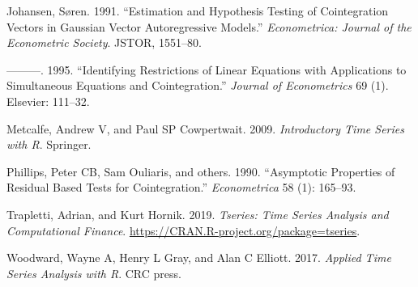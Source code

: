 \documentclass[12pt,]{article}
\begin{document}
\leavevmode\hypertarget{ref-johansen1991estimation}{}%
Johansen, Søren. 1991. ``Estimation and Hypothesis Testing of Cointegration Vectors in Gaussian Vector Autoregressive Models.'' \emph{Econometrica: Journal of the Econometric Society}. JSTOR, 1551--80.

\leavevmode\hypertarget{ref-johansen1995identifying}{}%
---------. 1995. ``Identifying Restrictions of Linear Equations with Applications to Simultaneous Equations and Cointegration.'' \emph{Journal of Econometrics} 69 (1). Elsevier: 111--32.

\leavevmode\hypertarget{ref-metcalfe2009introductory}{}%
Metcalfe, Andrew V, and Paul SP Cowpertwait. 2009. \emph{Introductory Time Series with R}. Springer.

\leavevmode\hypertarget{ref-phillips1990asymptotic}{}%
Phillips, Peter CB, Sam Ouliaris, and others. 1990. ``Asymptotic Properties of Residual Based Tests for Cointegration.'' \emph{Econometrica} 58 (1): 165--93.

\leavevmode\hypertarget{ref-R-tseries}{}%
Trapletti, Adrian, and Kurt Hornik. 2019. \emph{Tseries: Time Series Analysis and Computational Finance}. \url{https://CRAN.R-project.org/package=tseries}.

\leavevmode\hypertarget{ref-woodward2017applied}{}%
Woodward, Wayne A, Henry L Gray, and Alan C Elliott. 2017. \emph{Applied Time Series Analysis with R}. CRC press.
\end{document}
